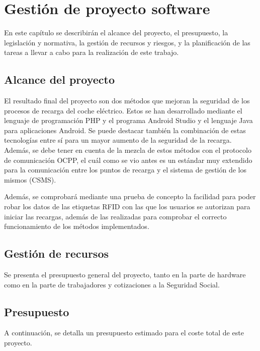 \documentclass[12pt,a4paper,onecolumn,oneside]{report}
\begin{document}
\chapter{Gestión de proyecto software}
\label{Gestión de proyecto software}

En este capítulo se describirán el alcance del proyecto, el presupuesto, la legislación y normativa, la gestión de recursos y riesgos, y la planificación de las tareas a llevar a cabo para la realización de este trabajo.


\section{Alcance del proyecto}
\label{Alcance del proyecto}

El resultado final del proyecto son dos métodos que mejoran la seguridad de los procesos de recarga del coche eléctrico. Estos se han desarrollado mediante el lenguaje de programación PHP y el programa Android Studio y el lenguaje Java para aplicaciones Android. Se puede destacar también la combinación de estas tecnologías entre sí para un mayor aumento de la seguridad de la recarga. Además, se debe tener en cuenta de la mezcla de estos métodos con el protocolo de comunicación OCPP, el cuál como se vio antes es un estándar muy extendido para la comunicación entre los puntos de recarga y el sistema de gestión de los mismos (CSMS).

Además, se comprobará mediante una prueba de concepto la facilidad para poder robar los datos de las etiquetas RFID con las que los usuarios se autorizan para iniciar las recargas, además de las realizadas para comprobar el correcto funcionamiento de los métodos implementados.



\section{Gestión de recursos}

Se presenta el presupuesto general del proyecto, tanto en la parte de hardware como en la parte de trabajadores y cotizaciones a la Seguridad Social.

\section{Presupuesto}

A continuación, se detalla un presupuesto estimado para el coste total de este proyecto.
\end{document}
